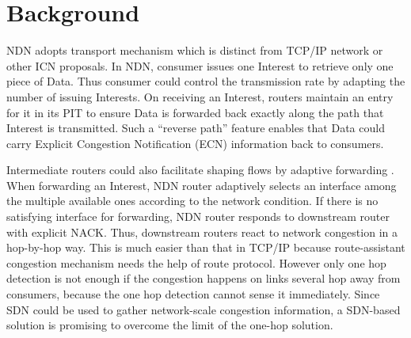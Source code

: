 
\section{Background}

\label{sec:bg}


NDN adopts transport mechanism \cite{NDN, Adaptive} which is distinct from TCP/IP network or other ICN proposals. In NDN, consumer issues one Interest to retrieve only one piece of Data. Thus consumer could control the transmission rate by adapting the number of issuing Interests. On receiving an Interest, routers maintain an entry for it in its PIT to ensure Data is forwarded back exactly along the path that Interest is transmitted. Such a ``reverse path'' feature enables that Data could carry Explicit Congestion Notification (ECN) information back to consumers.

Intermediate routers could also facilitate shaping flows by adaptive forwarding \cite{Adaptive}. When forwarding an Interest, NDN router adaptively selects an interface among the multiple available ones according to the network condition. If there is no satisfying interface for forwarding, NDN router responds to downstream router with explicit NACK. Thus, downstream routers react to network congestion in a hop-by-hop way. This is much easier than that in TCP/IP because route-assistant congestion mechanism needs the help of route protocol\cite{selfish}. However only one hop detection is not enough if the congestion happens on links several hop away from consumers, because the one hop detection cannot sense it immediately. Since SDN\cite{SDN} could be used to gather network-scale congestion information, a SDN-based solution is promising to overcome the limit of the one-hop solution.



